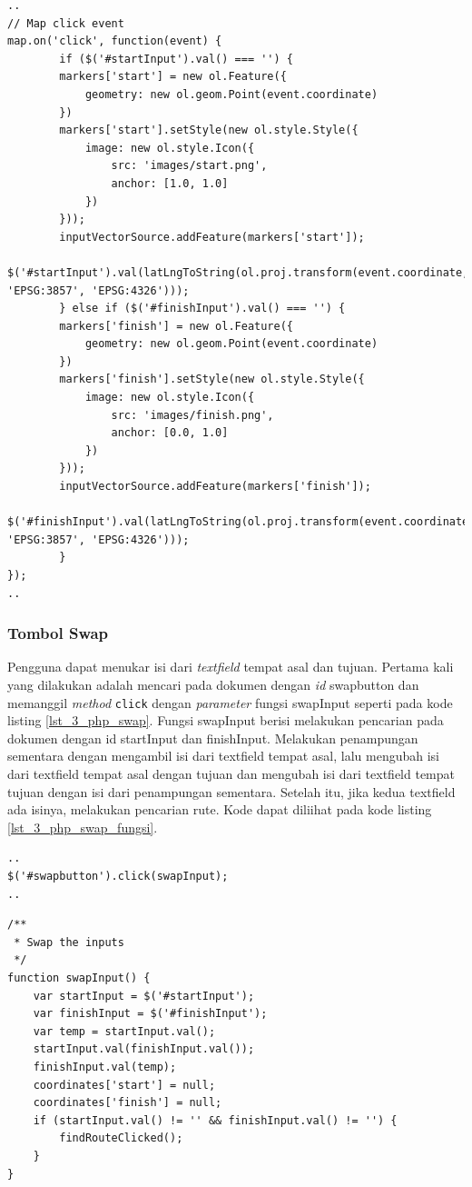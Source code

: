 \begin{enumerate}
	\begin{lstlisting}[caption=Membuat \textit{event} klik pada peta,label = {lst_3_php_textfield_koord_kode}]
..
// Map click event
map.on('click', function(event) {
    	if ($('#startInput').val() === '') {
		markers['start'] = new ol.Feature({
			geometry: new ol.geom.Point(event.coordinate)
		})
		markers['start'].setStyle(new ol.style.Style({
			image: new ol.style.Icon({
				src: 'images/start.png',
				anchor: [1.0, 1.0]
			})
		}));
		inputVectorSource.addFeature(markers['start']);
    		$('#startInput').val(latLngToString(ol.proj.transform(event.coordinate, 'EPSG:3857', 'EPSG:4326')));
    	} else if ($('#finishInput').val() === '') {
		markers['finish'] = new ol.Feature({
			geometry: new ol.geom.Point(event.coordinate)
		})
		markers['finish'].setStyle(new ol.style.Style({
			image: new ol.style.Icon({
				src: 'images/finish.png',
				anchor: [0.0, 1.0]
			})
		}));
		inputVectorSource.addFeature(markers['finish']);
    		$('#finishInput').val(latLngToString(ol.proj.transform(event.coordinate, 'EPSG:3857', 'EPSG:4326')));
    	}
});
..
\end{lstlisting}

\end{enumerate}

\subsubsection{Tombol Swap}
Pengguna dapat menukar isi dari \textit{textfield} tempat asal dan tujuan. Pertama kali yang dilakukan adalah mencari pada dokumen dengan \textit{id} swapbutton dan memanggil \textit{method} \verb!click! dengan \textit{parameter} fungsi swapInput seperti pada kode listing \ref{lst_3_php_swap}. Fungsi swapInput berisi melakukan pencarian pada dokumen dengan id startInput dan finishInput. Melakukan penampungan sementara dengan mengambil isi dari textfield tempat asal, lalu mengubah isi dari textfield tempat asal dengan tujuan dan mengubah isi dari textfield tempat tujuan dengan isi dari penampungan sementara. Setelah itu, jika kedua textfield ada isinya, melakukan pencarian rute. Kode dapat diliihat pada kode listing \ref{lst_3_php_swap_fungsi}.

\begin{lstlisting}[caption=\textit{Method} untuk memanggil fungsi JavaScript ketika tombol \textit{swap} ditekan ,label = {lst_3_php_swap}]
..
$('#swapbutton').click(swapInput);
..
\end{lstlisting}

\begin{lstlisting}[caption=Fungsi JavaScript untuk menukar isi \textit{textfield} tempat asal dan tujuan ,label = {lst_3_php_swap_fungsi}]	
/**
 * Swap the inputs
 */
function swapInput() {
	var startInput = $('#startInput');
	var finishInput = $('#finishInput');
	var temp = startInput.val();
	startInput.val(finishInput.val());
	finishInput.val(temp);
	coordinates['start'] = null;
	coordinates['finish'] = null;
	if (startInput.val() != '' && finishInput.val() != '') {
		findRouteClicked();
	}
}
\end{lstlisting}


